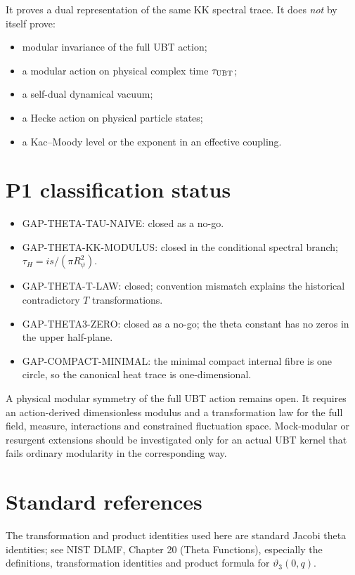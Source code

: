\documentclass[11pt,a4paper]{article}
\begin{document}
It proves a dual representation of the same KK spectral trace.  It does
\emph{not} by itself prove:
\begin{itemize}
 \item modular invariance of the full UBT action;
 \item a modular action on physical complex time $\tau_{\rm UBT}$;
 \item a self-dual dynamical vacuum;
 \item a Hecke action on physical particle states;
 \item a Kac--Moody level or the exponent in an effective coupling.
\end{itemize}

\section{P1 classification status}

\begin{tcolorbox}[colback=green!6!white,colframe=green!55!black,title=Closed]
\begin{itemize}
 \item GAP-THETA-TAU-NAIVE: closed as a no-go.
 \item GAP-THETA-KK-MODULUS: closed in the conditional spectral branch;
       $\tau_H=i s/(\pi R_\psi^2)$.
 \item GAP-THETA-T-LAW: closed; convention mismatch explains the historical
       contradictory $T$ transformations.
 \item GAP-THETA3-ZERO: closed as a no-go; the theta constant has no zeros in
       the upper half-plane.
 \item GAP-COMPACT-MINIMAL: the minimal compact internal fibre is one circle,
       so the canonical heat trace is one-dimensional.
\end{itemize}
\end{tcolorbox}

\begin{tcolorbox}[colback=yellow!8!white,colframe=orange!70!black,title=Open]
A physical modular symmetry of the full UBT action remains open.  It requires
an action-derived dimensionless modulus and a transformation law for the full
field, measure, interactions and constrained fluctuation space.  Mock-modular
or resurgent extensions should be investigated only for an actual UBT kernel
that fails ordinary modularity in the corresponding way.
\end{tcolorbox}

\section{Standard references}
The transformation and product identities used here are standard Jacobi theta
identities; see NIST DLMF, Chapter 20 (Theta Functions), especially the
definitions, transformation identities and product formula for
$\vartheta_3(0,q)$.
\end{document}
